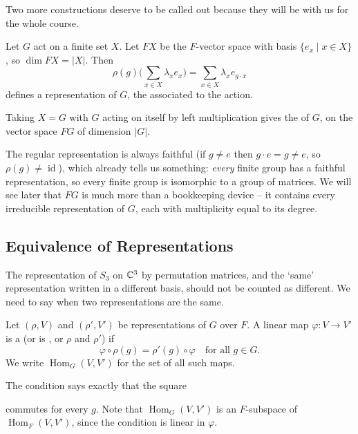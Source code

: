 \documentclass[a4paper]{scrartcl}
\newcommand{\Hom}{\operatorname{Hom}}
\newcommand{\id}{\operatorname{id}}
\begin{document}
Two more constructions deserve to be called out because they will be with us for the whole course.

\begin{definition}
	Let $G$ act on a finite set $X$. Let $FX$ be the $F$-vector space with basis $\{e_x \mid x \in X\}$, so $\dim FX = |X|$. Then
	$$\rho(g)\Big(\sum_{x \in X} \lambda_x e_x\Big) = \sum_{x \in X} \lambda_x e_{g \cdot x}$$
	defines a representation of $G$, the  associated to the action.
\end{definition}

\begin{definition}
	Taking $X = G$ with $G$ acting on itself by left multiplication gives the  of $G$, on the vector space $FG$ of dimension $|G|$.
\end{definition}

The regular representation is always faithful (if $g \neq e$ then $g \cdot e = g \neq e$, so $\rho(g) \neq \id$), which already tells us something: \emph{every} finite group has a faithful representation, so every finite group is isomorphic to a group of matrices. We will see later that $FG$ is much more than a bookkeeping device -- it contains every irreducible representation of $G$, each with multiplicity equal to its degree.

\subsection{Equivalence of Representations}

The representation of $S_3$ on $\mathbb{C}^3$ by permutation matrices, and the `same' representation written in a different basis, should not be counted as different. We need to say when two representations are the same.

\begin{definition}[$G$-homomorphism]
	Let $(\rho, V)$ and $(\rho', V')$ be representations of $G$ over $F$. A linear map $\varphi : V \to V'$ is a  (or is , or  $\rho$ and $\rho'$) if
	$$\varphi \circ \rho(g) = \rho'(g) \circ \varphi \quad \text{for all } g \in G.$$
	We write $\Hom_G(V, V')$ for the set of all such maps.
\end{definition}

The condition says exactly that the square
\begin{center}
\end{center}
commutes for every $g$. Note that $\Hom_G(V,V')$ is an $F$-subspace of $\Hom_F(V,V')$, since the condition is linear in $\varphi$.
\end{document}
